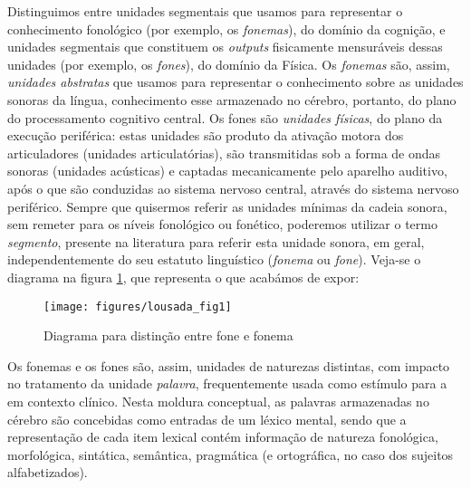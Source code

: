 \documentclass[output=paper]{LSP/langsci}
\begin{document}
Distinguimos entre unidades segmentais que usamos para representar o conhecimento fonológico (por exemplo, os \textit{fonemas}), do domínio da cognição, e unidades segmentais que constituem os \textit{outputs} fisicamente mensuráveis dessas unidades (por exemplo, os \textit{fones}), do domínio da Física. Os \textit{fonemas} são, assim, \textit{unidades abstratas} que usamos para representar o conhecimento sobre as unidades sonoras da língua, conhecimento esse armazenado no cérebro, portanto, do plano do processamento cognitivo central. Os fones são \textit{unidades físicas}, do plano da execução periférica: estas unidades são produto da ativação motora dos articuladores (unidades articulatórias), são transmitidas sob a forma de ondas sonoras (unidades acústicas) e captadas mecanicamente pelo aparelho auditivo, após o que são conduzidas ao sistema nervoso central, através do sistema nervoso periférico. Sempre que quisermos referir as unidades mínimas da cadeia sonora, sem remeter para os níveis fonológico ou fonético, poderemos utilizar o termo \textit{segmento}, presente na literatura para referir esta unidade sonora, em geral, independentemente do seu estatuto linguístico (\textit{fonema} ou \textit{fone}). Veja-se o diagrama na figura \ref{fig:lousada_1}, que representa o que acabámos de expor:

\begin{figure}
\texttt{[image: figures/lousada\_fig1]}
\caption{Diagrama para distinção entre fone e fonema }
\label{fig:lousada_1}
\end{figure}

Os fonemas e os fones são, assim, unidades de naturezas distintas, com impacto no tratamento da unidade \textit{palavra}, frequentemente usada como estímulo para a  em contexto clínico. Nesta moldura conceptual, as palavras armazenadas no cérebro são concebidas como entradas de um léxico mental, sendo que a representação de cada item lexical contém informação de natureza fonológica, morfológica, sintática, semântica, pragmática (e ortográfica, no caso dos sujeitos alfabetizados). 
\end{document}
